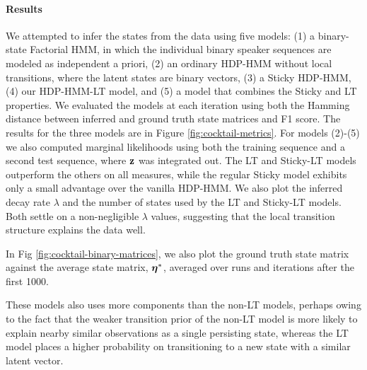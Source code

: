 \paragraph{Results}
We attempted to infer the states
from the data using five models: (1) a binary-state Factorial HMM, in which the
individual binary speaker sequences are modeled as independent a
priori, (2) an ordinary HDP-HMM without local transitions, where the
latent states are binary vectors, (3) a Sticky HDP-HMM, (4) our
HDP-HMM-LT model, and (5) a model that combines the Sticky and LT
properties.  We evaluated the models at each
iteration using both the Hamming distance between inferred 
and ground truth state matrices and F1 score.
The results for the three models are in Figure
\ref{fig:cocktail-metrics}.  
For models (2)-(5) we also computed marginal likelihoods using both
the training sequence and a second test sequence, where $\mathbf{z}$ was
integrated out.  The LT and Sticky-LT models outperform the others on
all measures, while the regular Sticky model exhibits only a small
advantage over the vanilla HDP-HMM.  We also plot the inferred decay
rate $\lambda$ and the number of states used by the
LT and Sticky-LT models.  Both settle on a non-negligible $\lambda$
values, suggesting that the local transition structure
explains the data well.  

In Fig \ref{fig:cocktail-binary-matrices}, we also plot the ground truth state
matrix against the average state matrix, $\boldsymbol{\eta}^*$, 
averaged over runs and iterations after the first 1000.

These models also uses more components than the non-LT
models, perhaps owing to the fact that the weaker transition prior of
the non-LT model is more likely to explain nearby similar observations
as a single persisting state, whereas the LT model places a higher
probability on transitioning to a new state with a similar latent vector.

